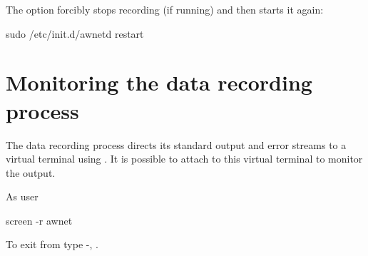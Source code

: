 \label{awnetd-restart}
The  option forcibly stops recording (if running) and
then starts it again:
\begin{Cmd}
sudo /etc/init.d/awnetd restart
\end{Cmd}

\section{Monitoring the data recording process}
\label{monitor-daemon-output}
The data recording process directs its standard output and error
streams to a virtual terminal using . It is possible to
attach to this virtual terminal to monitor the output.

As user \piUser
\begin{Cmd}
screen -r awnet
\end{Cmd}

To exit from  type -,
. 




